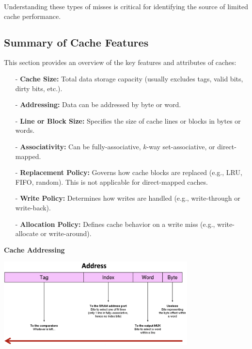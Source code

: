 Understanding these types of misses is critical for identifying the source of limited cache performance.

\subsection{Summary of Cache Features}

This section provides an overview of the key features and attributes of caches:

\begin{itemize}
    \item[-] \textbf{Cache Size:} Total data storage capacity (usually excludes tags, valid bits, dirty bits, etc.).
    \item[-] \textbf{Addressing:} Data can be addressed by byte or word.
    \item[-] \textbf{Line or Block Size:} Specifies the size of cache lines or blocks in bytes or words.
    \item[-] \textbf{Associativity:} Can be fully-associative, $k$-way set-associative, or direct-mapped.
    \item[-] \textbf{Replacement Policy:} Governs how cache blocks are replaced (e.g., LRU, FIFO, random). This is not applicable for direct-mapped caches.
    \item[-] \textbf{Write Policy:} Determines how writes are handled (e.g., write-through or write-back).
    \item[-] \textbf{Allocation Policy:} Defines cache behavior on a write miss (e.g., write-allocate or write-around).
\end{itemize}
\textbf{Cache Addressing}
\begin{center}
    \includegraphics[width=0.75\textwidth]{chapters/chapter3a/images/summary_add.png}
\end{center}
